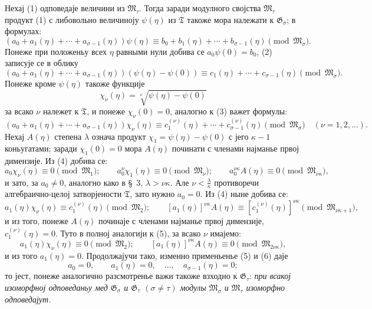 ﻿\documentclass[11pt]{article}
\begin{document}
Нехај (1) одповедаје величини из $\mathfrak M_\tau$. Тогда заради модулного
својства $\mathfrak M_\tau$ продукт (1) с либовольно величиноју $\psi(\eta)$ из
$\mathfrak T$ такоже мора належати к $\mathfrak G_\sigma$; в формулах:
\begin{equation}
(a_0+a_1(\eta)+\cdots+a_{\sigma-1}(\eta))\psi(\eta)
\equiv b_0+b_1(\eta)+\cdots+b_{\sigma-1}(\eta)
\pmod{\mathfrak M_\sigma}.
\tag{2}
\end{equation}
Понеже при положеньу всех $\eta$ равными нули добива се $a_0\psi(0)=b_0$,
(2) записује се в облику
\begin{equation}
(a_0+a_1(\eta)+\cdots+a_{\sigma-1}(\eta))(\psi(\eta)-\psi(0))
\equiv c_1(\eta)+\cdots+c_{\sigma-1}(\eta)
\pmod{\mathfrak M_\sigma}.
\tag{3}
\end{equation}
Понеже кроме $\psi(\eta)$ такоже функције
\[
 \chi_\nu(\eta)=\sqrt[\nu]{\psi(\eta)-\psi(0)}
\]
за всако $\nu$ належет к $\mathfrak T$, и понеже $\chi_\nu(0)=0$, аналогно к
(3) важет формулы:
\begin{equation}
(a_0+a_1(\eta)+\cdots+a_{\sigma-1}(\eta))\chi_\nu(\eta)
\equiv c_1^{(\nu)}(\eta)+\cdots+c_{\sigma-1}^{(\nu)}(\eta)
\pmod{\mathfrak M_\sigma}
\quad(\nu=1,2,\ldots).
\tag{4}
\end{equation}
Нехај $A(\eta)$ степена $\lambda$ означа продукт
$\chi_1=\psi(\eta)-\psi(0)$ с јего $\kappa-1$ коньугатами; заради
$\chi_1(0)=0$ мора $A(\eta)$ починати с членами најманье првој димензије. Из
(4) добива се:
\begin{equation}
a_0\chi_\nu(\eta)\equiv0\pmod{\mathfrak M_1};\qquad
a_0^\nu\chi_1(\eta)\equiv0\pmod{\mathfrak M_\nu};\qquad
a_0^{\nu\kappa}A(\eta)\equiv0\pmod{\mathfrak M_{\nu\kappa}},
\tag{5}
\end{equation}
и зато, за $a_0\ne0$, аналогно како в \S\ 3, $\lambda>\nu\kappa$. Але
$\nu<\frac{\lambda}{\kappa}$ противоречи алгебраично-целој затворјености
$\mathfrak T$, зато нужно $a_0=0$. Из (4) ныне добива се:
\begin{equation}
a_1(\eta)\chi_\nu(\eta)\equiv c_1^{(\nu)}(\eta)\pmod{\mathfrak M_2};\qquad
[a_1(\eta)]^{\nu\kappa}A(\eta)
\equiv[c_1^{(\nu)}(\eta)]^{\nu\kappa}\pmod{\mathfrak M_{\nu\kappa+1}},
\tag{6}
\end{equation}
и из того, понеже $A(\eta)$ починаје с членами најманье првој димензије,
$c_1^{(\nu)}(\eta)=0$. Туто в полној аналогији к (5), за всако $\nu$ имајемо:
\[
 a_1(\eta)\chi_\nu(\eta)\equiv0\pmod{\mathfrak M_2};\qquad
 [a_1(\eta)]^{\nu\kappa}A(\eta)\equiv0\pmod{\mathfrak M_{2\nu\kappa}},
\]
и из того $a_1(\eta)=0$. Продолжајучи тако, изменно применьенье (5) и (6) даје
\[
 a_0=0,\qquad a_1(\eta)=0,\quad \ldots,\quad a_{\sigma-1}(\eta)=0;
\]
то јест, понеже аналогично разсмотренье важи такоже взходно к
$\mathfrak G_\tau$: {\itshape при всакој изоморфној одповеданьу мед
$\mathfrak G_\sigma$ и $\mathfrak G_\tau$ $(\sigma\ne\tau)$ модулы
$\mathfrak M_\sigma$ и $\mathfrak M_\tau$ изоморфно одповедајут.}
\end{document}
